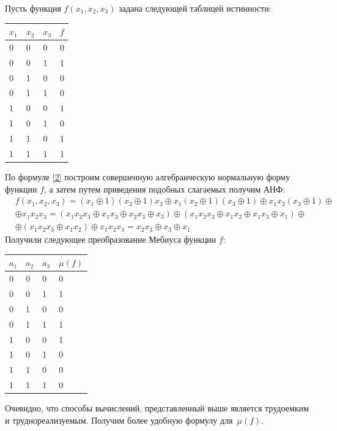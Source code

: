 \begin{example} Пусть функция $f(x_1,x_2,x_3)$ задана следующей таблицей истинности:
\begin{center}
    
\renewcommand{\arraystretch}{0.8}
    \begin{tabular}{lll|l}
    $x_1$ & $x_2$ & $x_3$ & $f$ \\ \hline
    0  & 0  & 0  & 0 \\
    0  & 0  & 1  & 1 \\
    0  & 1  & 0  & 0 \\
    0  & 1  & 1  & 0 \\
    1  & 0  & 0  & 1 \\
    1  & 0  & 1  & 0 \\
    1  & 1  & 0  & 1 \\
    1  & 1  & 1  & 1 \\
    \end{tabular}
\end{center}
По формуле \eqref{2} построим совершенную алгебраическую нормальную форму функции $f$, а затем путем приведения подобных слагаемых получим АНФ:
\begin{align*}
    &f(x_1,x_2,x_3) = (x_1 \oplus 1)(x_2 \oplus 1)x_3 \oplus x_1(x_2 \oplus 1)(x_3 \oplus 1) \oplus x_1x_2(x_3 \oplus 1) \oplus\\
    &\oplus x_1x_2x_3 = (x_1x_2x_3 \oplus x_1x_3 \oplus x_2x_3 \oplus x_3) \oplus (x_1x_2x_3 \oplus x_1x_2 \oplus x_1x_3 \oplus x_1) \oplus \\
    &\oplus (x_1x_2x_3 \oplus x_1x_2) \oplus x_1x_2x_3 = x_2x_3 \oplus x_3 \oplus x_1
\end{align*}
Получили следующее преобразование Мебиуса функции $f$:
\begin{center}
\renewcommand{\arraystretch}{0.8}
    \begin{tabular}{lll|l}
    $a_1$ & $a_2$ & $a_3$ & $\mu (f)$ \\ \hline
    0  & 0  & 0  & 0 \\
    0  & 0  & 1  & 1 \\
    0  & 1  & 0  & 0 \\
    0  & 1  & 1  & 1 \\
    1  & 0  & 0  & 1 \\
    1  & 0  & 1  & 0 \\
    1  & 1  & 0  & 0 \\
    1  & 1  & 1  & 0 \\
    \end{tabular}
\end{center}
\label{ex1}
\end{example}
Очевидно, что способы вычислений, представленный выше является трудоемким и труднореализуемым. Получим более удобную формулу для~$\mu (f)$.

